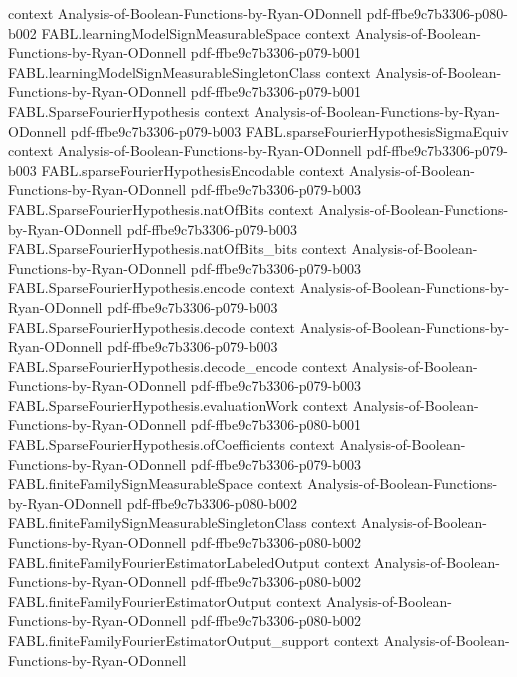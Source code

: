 \begin{theorem}
  {context}
  {Analysis-of-Boolean-Functions-by-Ryan-ODonnell}
  {pdf-ffbe9c7b3306-p080-b002}
\proofstep
  {FABL.learningModelSignMeasurableSpace}
  {context}
  {Analysis-of-Boolean-Functions-by-Ryan-ODonnell}
  {pdf-ffbe9c7b3306-p079-b001}
\proofstep
  {FABL.learningModelSignMeasurableSingletonClass}
  {context}
  {Analysis-of-Boolean-Functions-by-Ryan-ODonnell}
  {pdf-ffbe9c7b3306-p079-b001}
\proofstep
  {FABL.SparseFourierHypothesis}
  {context}
  {Analysis-of-Boolean-Functions-by-Ryan-ODonnell}
  {pdf-ffbe9c7b3306-p079-b003}
\proofstep
  {FABL.sparseFourierHypothesisSigmaEquiv}
  {context}
  {Analysis-of-Boolean-Functions-by-Ryan-ODonnell}
  {pdf-ffbe9c7b3306-p079-b003}
\proofstep
  {FABL.sparseFourierHypothesisEncodable}
  {context}
  {Analysis-of-Boolean-Functions-by-Ryan-ODonnell}
  {pdf-ffbe9c7b3306-p079-b003}
\proofstep
  {FABL.SparseFourierHypothesis.natOfBits}
  {context}
  {Analysis-of-Boolean-Functions-by-Ryan-ODonnell}
  {pdf-ffbe9c7b3306-p079-b003}
\proofstep
  {FABL.SparseFourierHypothesis.natOfBits_bits}
  {context}
  {Analysis-of-Boolean-Functions-by-Ryan-ODonnell}
  {pdf-ffbe9c7b3306-p079-b003}
\proofstep
  {FABL.SparseFourierHypothesis.encode}
  {context}
  {Analysis-of-Boolean-Functions-by-Ryan-ODonnell}
  {pdf-ffbe9c7b3306-p079-b003}
\proofstep
  {FABL.SparseFourierHypothesis.decode}
  {context}
  {Analysis-of-Boolean-Functions-by-Ryan-ODonnell}
  {pdf-ffbe9c7b3306-p079-b003}
\proofstep
  {FABL.SparseFourierHypothesis.decode_encode}
  {context}
  {Analysis-of-Boolean-Functions-by-Ryan-ODonnell}
  {pdf-ffbe9c7b3306-p079-b003}
\proofstep
  {FABL.SparseFourierHypothesis.evaluationWork}
  {context}
  {Analysis-of-Boolean-Functions-by-Ryan-ODonnell}
  {pdf-ffbe9c7b3306-p080-b001}
\proofstep
  {FABL.SparseFourierHypothesis.ofCoefficients}
  {context}
  {Analysis-of-Boolean-Functions-by-Ryan-ODonnell}
  {pdf-ffbe9c7b3306-p079-b003}
\proofstep
  {FABL.finiteFamilySignMeasurableSpace}
  {context}
  {Analysis-of-Boolean-Functions-by-Ryan-ODonnell}
  {pdf-ffbe9c7b3306-p080-b002}
\proofstep
  {FABL.finiteFamilySignMeasurableSingletonClass}
  {context}
  {Analysis-of-Boolean-Functions-by-Ryan-ODonnell}
  {pdf-ffbe9c7b3306-p080-b002}
\proofstep
  {FABL.finiteFamilyFourierEstimatorLabeledOutput}
  {context}
  {Analysis-of-Boolean-Functions-by-Ryan-ODonnell}
  {pdf-ffbe9c7b3306-p080-b002}
\proofstep
  {FABL.finiteFamilyFourierEstimatorOutput}
  {context}
  {Analysis-of-Boolean-Functions-by-Ryan-ODonnell}
  {pdf-ffbe9c7b3306-p080-b002}
\proofstep
  {FABL.finiteFamilyFourierEstimatorOutput_support}
  {context}
  {Analysis-of-Boolean-Functions-by-Ryan-ODonnell}

\end{theorem}
